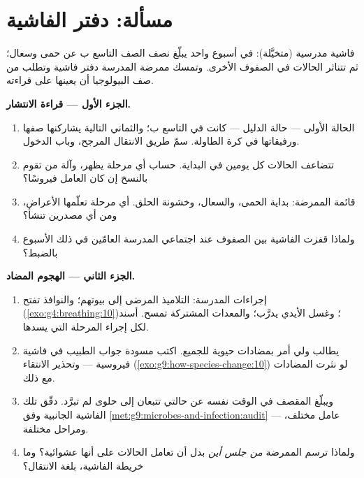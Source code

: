 \section{مسألة: دفتر الفاشية}

\begin{problem}\label{pb:g9:microbes-and-infection:1}
فاشية مدرسية (متخيَّلة): في أسبوع واحد يبلّغ نصف الصف
التاسع ب عن حمى وسعال؛ ثم تتناثر الحالات في الصفوف
الأخرى. وتمسك ممرضة المدرسة دفتر فاشية وتطلب من صف
البيولوجيا أن يعينها على قراءته.

\medskip\noindent\textbf{الجزء الأول --- قراءة الانتشار.}
\begin{enumerate}
  \item الحالة الأولى --- حالة الدليل --- كانت في التاسع
        ب؛ والثماني التالية يشاركنها صفها ورفيقاتها في
        كرة الطاولة. سمّ طريق الانتقال المرجح، وباب
        الدخول.
  \item تتضاعف الحالات كل يومين في البداية. حساب أي
        مرحلة يظهر، وآلة من تقوم بالنسخ إن كان العامل
        فيروسًا؟
  \item قائمة الممرضة: بداية الحمى، والسعال، وخشونة
        الحلق. أي مرحلة تعلّمها الأعراض، ومن أي مصدرين
        تنشأ؟
  \item ولماذا قفزت الفاشية بين الصفوف عند اجتماعي
        المدرسة العامّين في ذلك الأسبوع بالضبط؟
\end{enumerate}

\medskip\noindent\textbf{الجزء الثاني --- الهجوم المضاد.}
\begin{enumerate}[resume]
  \item إجراءات المدرسة: التلاميذ المرضى إلى بيوتهم؛
        والنوافذ تفتح (\cref{exo:g4:breathing:10})؛ وغسل
        الأيدي يدرَّب؛ والمعدات المشتركة تمسح. أسند لكل
        إجراء المرحلة التي يسدها.
  \item يطالب ولي أمر بمضادات حيوية للجميع. اكتب مسودة
        جواب الطبيب في فاشية فيروسية --- وتحذير الانتقاء
        (\cref{exo:g9:how-species-change:10}) لو نثرت
        المضادات مع ذلك.
  \item ويبلّغ المقصف في الوقت نفسه عن حالتي  تتبعان
        إلى حلوى لم تبرَّد. دقّق تلك الفاشية الجانبية وفق
        \cref{met:g9:microbes-and-infection:audit} ---
         عامل مختلف، ومراحل مختلفة.
  \item ولماذا ترسم الممرضة \emph{من جلس أين} بدل أن
        تعامل الحالات على أنها عشوائية؟ وما خريطة
        الفاشية، بلغة الانتقال؟
\end{enumerate}


\end{problem}
